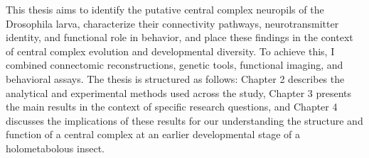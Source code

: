 
    This thesis aims to identify the putative central complex neuropils of the Drosophila larva, characterize their connectivity pathways, neurotransmitter identity, and functional role in behavior, and place these findings in the context of central complex evolution and developmental diversity. To achieve this, I combined connectomic reconstructions, genetic tools, functional imaging, and behavioral assays. The thesis is structured as follows: Chapter 2 describes the analytical and experimental methods used across the study, Chapter 3 presents the main results in the context of specific research questions, and Chapter 4 discusses the implications of these results for our understanding the structure and function of a central complex at an earlier developmental stage of a holometabolous insect.


